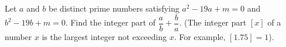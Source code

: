 Let $a$ and $b$ be distinct prime numbers satisfying $a^{2}-19a+m=0$ and $b^{2}-19b+m=0$. Find the integer part of $\dfrac{a}{b}+\dfrac{b}{a}$. (The integer part $[x]$ of a number $x$ is the largest integer not exceeding $x$. For example, $[1.75]=1$).
